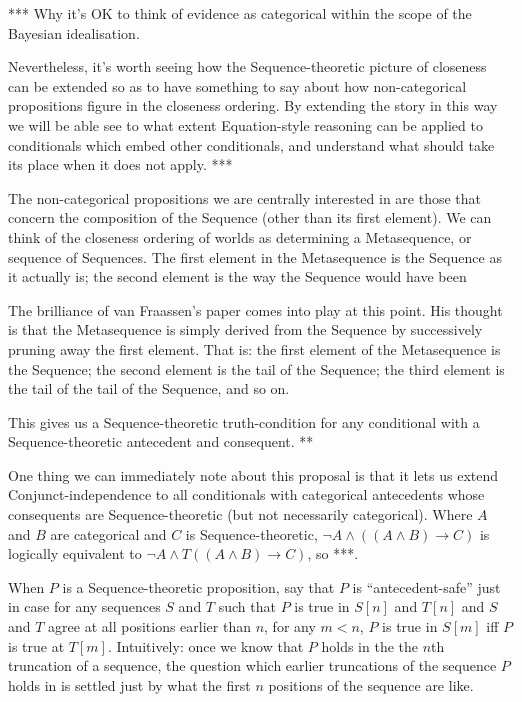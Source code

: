 \documentclass[If.tex]{subfiles}
\begin{document}
*** Why it's OK to think of evidence as categorical within the scope of the Bayesian idealisation.  

Nevertheless, it's worth seeing how the Sequence-theoretic picture of closeness can be extended so as to have something to say about how non-categorical propositions figure in the closeness ordering.  By extending the story in this way we will be able see to what extent Equation-style reasoning can be applied to conditionals which embed other conditionals, and understand what should take its place when it does not apply.  ***

The non-categorical propositions we are centrally interested in are those that concern the composition of the Sequence (other than its first element).  We can think of the closeness ordering of worlds as determining a Metasequence, or sequence of Sequences.  The first element in the Metasequence is the Sequence as it actually is; the second element is the way the Sequence would have been 

The brilliance of van Fraassen's paper comes into play at this point.  His thought is that the Metasequence is simply derived from the Sequence by successively pruning away the first element.  That is: the first element of the Metasequence is the Sequence; the second element is the tail of the Sequence; the third element is the tail of the tail of the Sequence, and so on.  

This gives us a Sequence-theoretic truth-condition for any conditional with a Sequence-theoretic antecedent and consequent.  **

One thing we can immediately note about this proposal is that it lets us extend Conjunct-independence to all conditionals with categorical antecedents whose consequents are Sequence-theoretic (but not necessarily categorical).  Where $A$ and $B$ are categorical and $C$ is Sequence-theoretic, $¬A ∧ ((A∧B)→C)$ is logically equivalent to $¬A ∧ T((A∧B)→C)$, so ***.  

When $P$ is a Sequence-theoretic proposition, say that $P$ is “antecedent-safe” just in case for any sequences $S$ and $T$ such that $P$ is true in $S[n]$ and $T[n]$ and $S$ and $T$ agree at all positions earlier than $n$, for any $m<n$, $P$ is true in $S[m]$ iff $P$ is true at $T[m]$.  Intuitively: once we know that $P$ holds in the the $n$th truncation of a sequence, the question which earlier truncations of the sequence $P$ holds in is settled just by what the first $n$ positions of the sequence are like.  
\end{document}
